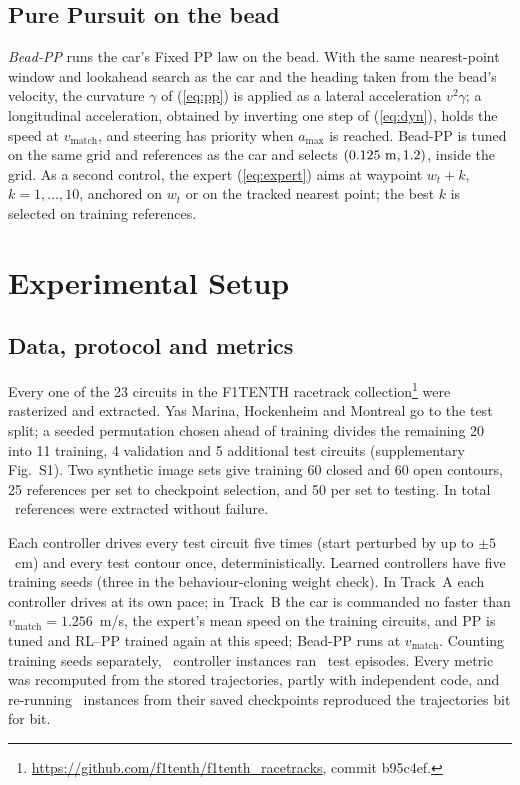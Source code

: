 \documentclass{IJCAS}
\begin{document}
\subsection{Pure Pursuit on the bead}\label{sec:beadpp}
\emph{Bead-PP} runs the car's Fixed PP law on the bead. With the same nearest-point window and lookahead search as the car and the heading taken from the bead's velocity, the curvature $\gamma$ of (\ref{eq:pp}) is applied as a lateral acceleration $v^2\gamma$; a longitudinal acceleration, obtained by inverting one step of (\ref{eq:dyn}), holds the speed at $v_{\mathrm{match}}$, and steering has priority when $a_{\max}$ is reached. Bead-PP is tuned on the same grid and references as the car and selects $(\VbppL\ \mathrm{m},\VbppG)$, inside the grid. As a second control, the expert (\ref{eq:expert}) aims at waypoint $w_t+k$, $k=1,\dots,10$, anchored on $w_t$ or on the tracked nearest point; the best $k$ is selected on training references.

\section{Experimental Setup}
\subsection{Data, protocol and metrics}
Every one of the 23 circuits in the F1TENTH racetrack collection\footnote{\url{https://github.com/f1tenth/f1tenth_racetracks}, commit b95c4ef.} were rasterized and extracted. Yas Marina, Hockenheim and Montreal go to the test split; a seeded permutation chosen ahead of training divides the remaining 20 into 11 training, 4 validation and 5 additional test circuits (supplementary Fig.~S1). Two synthetic image sets give training 60 closed and 60 open contours, 25 references per set to checkpoint selection, and 50 per set to testing. In total \VnRefs\ references were extracted without failure.

Each controller drives every test circuit five times (start perturbed by up to $\pm5$~cm) and every test contour once, deterministically. Learned controllers have five training seeds (three in the behaviour-cloning weight check). In Track~A each controller drives at its own pace; in Track~B the car is commanded no faster than $v_{\mathrm{match}}=1.256$~m/s, the expert's mean speed on the training circuits, and PP is tuned and RL--PP trained again at this speed; Bead-PP runs at $v_{\mathrm{match}}$. Counting training seeds separately, \VnInst\ controller instances ran \VnEpisodes\ test episodes. Every metric was recomputed from the stored trajectories, partly with independent code, and re-running \VnRerun\ instances from their saved checkpoints reproduced the trajectories bit for bit.
\end{document}
